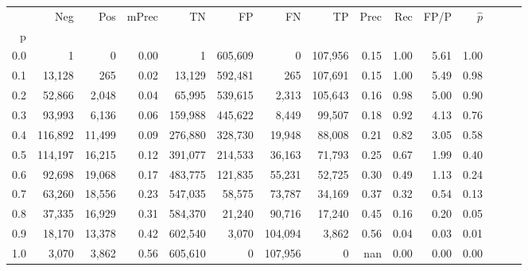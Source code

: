 \begin{tabular}{rrrrrrrrrrrrrrr}
\toprule
{} &      Neg &     Pos & mPrec &       TN &       FP &       FN &       TP &  Prec &   Rec &  FP/P & $\hat{p}$ \\
p   &          &         &       &          &          &          &          &       &       &       &           \\
\midrule
0.0 &        1 &       0 &  0.00 &        1 &  605,609 &        0 &  107,956 &  0.15 &  1.00 &  5.61 &      1.00 \\
0.1 &   13,128 &     265 &  0.02 &   13,129 &  592,481 &      265 &  107,691 &  0.15 &  1.00 &  5.49 &      0.98 \\
0.2 &   52,866 &   2,048 &  0.04 &   65,995 &  539,615 &    2,313 &  105,643 &  0.16 &  0.98 &  5.00 &      0.90 \\
0.3 &   93,993 &   6,136 &  0.06 &  159,988 &  445,622 &    8,449 &   99,507 &  0.18 &  0.92 &  4.13 &      0.76 \\
0.4 &  116,892 &  11,499 &  0.09 &  276,880 &  328,730 &   19,948 &   88,008 &  0.21 &  0.82 &  3.05 &      0.58 \\
0.5 &  114,197 &  16,215 &  0.12 &  391,077 &  214,533 &   36,163 &   71,793 &  0.25 &  0.67 &  1.99 &      0.40 \\
0.6 &   92,698 &  19,068 &  0.17 &  483,775 &  121,835 &   55,231 &   52,725 &  0.30 &  0.49 &  1.13 &      0.24 \\
0.7 &   63,260 &  18,556 &  0.23 &  547,035 &   58,575 &   73,787 &   34,169 &  0.37 &  0.32 &  0.54 &      0.13 \\
0.8 &   37,335 &  16,929 &  0.31 &  584,370 &   21,240 &   90,716 &   17,240 &  0.45 &  0.16 &  0.20 &      0.05 \\
0.9 &   18,170 &  13,378 &  0.42 &  602,540 &    3,070 &  104,094 &    3,862 &  0.56 &  0.04 &  0.03 &      0.01 \\
1.0 &    3,070 &   3,862 &  0.56 &  605,610 &        0 &  107,956 &        0 &   nan &  0.00 &  0.00 &      0.00 \\
\bottomrule
\end{tabular}
